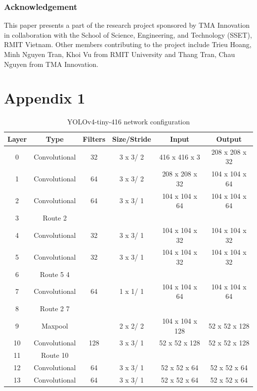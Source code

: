 \documentclass[10pt, letterpaper]{article}
\begin{document}
\subsubsection*{Acknowledgement}
    This paper presents a part of the research project sponsored by TMA Innovation in collaboration with the School of Science, Engineering, and Technology (SSET), RMIT Vietnam. Other members contributing to the project include Trieu Hoang, Minh Nguyen Tran, Khoi Vu from RMIT University and Thang Tran, Chau Nguyen from TMA Innovation.

\pagebreak
\section*{Appendix 1}
    \begin{table}[h!]
        \caption*{YOLOv4-tiny-416 network configuration}
        \centering
        \renewcommand{\arraystretch}{1}
        \begin{tabular}{c c c c c c}
            \hline
            Layer & Type & Filters & Size/Stride & Input & Output \\ 
            \hline
            0 & Convolutional & 32 & 3 x 3/ 2 & 416 x 416 x 3 & 208 x 208 x 32 \\
            1 & Convolutional & 64 & 3 x 3/ 2 & 208 x 208 x 32 & 104 x 104 x 64  \\
            2 & Convolutional & 64 & 3 x 3/ 1 & 104 x 104 x 64 & 104 x 104 x 64\\
            3 & Route 2				\\
            4 & Convolutional & 32 & 3 x 3/ 1 & 104 x 104 x 32 & 104 x 104 x 32\\
            5 & Convolutional & 32 & 3 x 3/ 1 & 104 x 104 x 32 & 104 x 104 x 32\\
            6 & Route 5 4				\\
            7 & Convolutional & 64 & 1 x 1/ 1 & 104 x 104 x 64 & 104 x 104 x 64\\
            8 & Route 2 7				\\
            9 & Maxpool & {} & 2 x 2/ 2 & 104 x 104 x 128 & 52 x 52 x 128\\
            10 & Convolutional & 128 & 3 x 3/ 1 & 52 x 52 x 128 & 52 x 52 x 128\\
            11 & Route 10				\\
            12 & Convolutional & 64 & 3 x 3/ 1 & 52 x 52 x 64 & 52 x 52 x 64\\
            13 & Convolutional & 64 & 3 x 3/ 1 & 52 x 52 x 64 & 52 x 52 x 64\\

\end{tabular}
\end{table}
\end{document}
